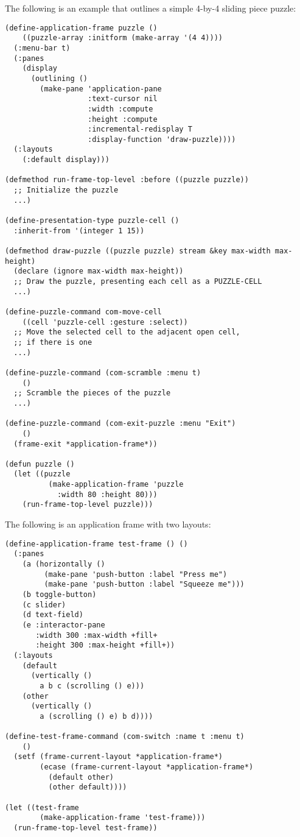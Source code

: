 The following is an example that outlines a simple 4-by-4 sliding piece puzzle:

\begin{verbatim}
(define-application-frame puzzle ()
    ((puzzle-array :initform (make-array '(4 4))))
  (:menu-bar t)
  (:panes
    (display
      (outlining ()
        (make-pane 'application-pane
                   :text-cursor nil
                   :width :compute
                   :height :compute
                   :incremental-redisplay T
                   :display-function 'draw-puzzle))))
  (:layouts
    (:default display)))

(defmethod run-frame-top-level :before ((puzzle puzzle))
  ;; Initialize the puzzle
  ...)

(define-presentation-type puzzle-cell ()
  :inherit-from '(integer 1 15))

(defmethod draw-puzzle ((puzzle puzzle) stream &key max-width max-height)
  (declare (ignore max-width max-height))
  ;; Draw the puzzle, presenting each cell as a PUZZLE-CELL
  ...)

(define-puzzle-command com-move-cell
    ((cell 'puzzle-cell :gesture :select))
  ;; Move the selected cell to the adjacent open cell,
  ;; if there is one
  ...)

(define-puzzle-command (com-scramble :menu t)
    ()
  ;; Scramble the pieces of the puzzle
  ...)

(define-puzzle-command (com-exit-puzzle :menu "Exit")
    ()
  (frame-exit *application-frame*))

(defun puzzle ()
  (let ((puzzle
          (make-application-frame 'puzzle
            :width 80 :height 80)))
    (run-frame-top-level puzzle)))
\end{verbatim}

The following is an application frame with two layouts:

\begin{verbatim}
(define-application-frame test-frame () ()
  (:panes
    (a (horizontally ()
         (make-pane 'push-button :label "Press me")
         (make-pane 'push-button :label "Squeeze me")))
    (b toggle-button)
    (c slider)
    (d text-field)
    (e :interactor-pane
       :width 300 :max-width +fill+
       :height 300 :max-height +fill+))
  (:layouts
    (default
      (vertically ()
        a b c (scrolling () e)))
    (other
      (vertically ()
        a (scrolling () e) b d))))

(define-test-frame-command (com-switch :name t :menu t)
    ()
  (setf (frame-current-layout *application-frame*)
        (ecase (frame-current-layout *application-frame*)
          (default other)
          (other default))))

(let ((test-frame
        (make-application-frame 'test-frame)))
  (run-frame-top-level test-frame))
\end{verbatim}
